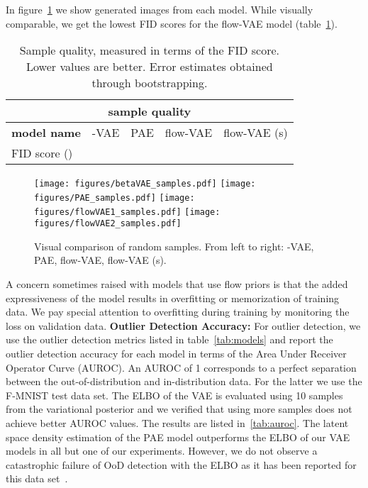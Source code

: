\documentclass[10pt]{article} \usepackage[accepted]{tmlr}
\newcommand{\rev}[1]{{\color{black}#1}}
\begin{document}
In figure~\ref{fig:samples} we show generated images from each model. While visually comparable, we get the lowest FID scores for the flow-VAE model (table~\ref{tab:sample_qual}).
\begin{table}[h]
\begin{center}
\begin{tabular}{lllll}
\multicolumn{5}{c}{\textbf{sample quality}}                                                                      \\ \hline
\multicolumn{1}{c|}{\textbf{model name}}   & \multicolumn{1}{c|}{-VAE} & \multicolumn{1}{c|}{PAE}         & \multicolumn{1}{c|}{flow-VAE} & \multicolumn{1}{c}{flow-VAE (s)} \\ \hline
\multicolumn{1}{l|}{FID score ()} & \multicolumn{1}{l|}{}       & \multicolumn{1}{l|}{} &      \multicolumn{1}{l|}{}         &              \\
\end{tabular}
\end{center}
\caption{\label{tab:sample_qual} Sample quality, measured in terms of the FID score. Lower values are better. Error estimates obtained through bootstrapping. }
\end{table}
\begin{figure}
\texttt{[image: figures/betaVAE\_samples.pdf]}
\texttt{[image: figures/PAE\_samples.pdf]}
\texttt{[image: figures/flowVAE1\_samples.pdf]}
\texttt{[image: figures/flowVAE2\_samples.pdf]}
\caption{Visual comparison of random samples. From left to right: -VAE, PAE, flow-VAE, flow-VAE (s).}
\label{fig:samples}
\end{figure}
A concern sometimes raised with models that use flow priors is that the added expressiveness of the model results in overfitting or memorization of training data. We pay special attention to overfitting during training by monitoring the loss on validation data.
\newline
\textbf{Outlier Detection Accuracy:}
For outlier detection, we use the outlier detection metrics listed in table~\ref{tab:models} and report the outlier detection accuracy for each model in terms of the Area Under Receiver Operator Curve (AUROC). An AUROC of 1 corresponds to a perfect separation between the out-of-distribution and in-distribution data. For the latter we use the F-MNIST test data set. \rev{The ELBO of the VAE is evaluated using 10 samples from the variational posterior and we verified that using more samples does not achieve better AUROC values.} The results are listed in~\ref{tab:auroc}. The latent space density estimation of the PAE model outperforms the ELBO of our VAE models in all but one of our experiments. However, we do not observe a catastrophic failure of OoD detection with the ELBO as it has been reported for this data set~\citep{Nalisnick2019}. 
\end{document}
